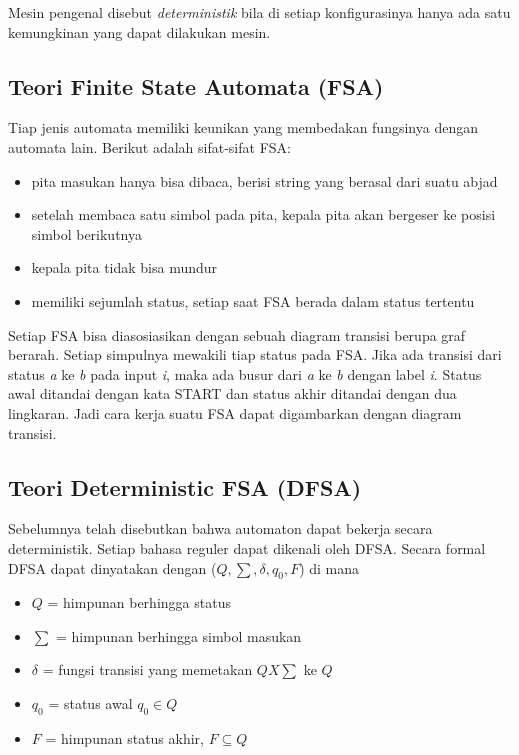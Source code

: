 Mesin pengenal disebut \textit{deterministik} bila di setiap konfigurasinya hanya ada satu kemungkinan yang dapat dilakukan mesin.

\subsection{Teori Finite State Automata (FSA)\cite{Frisca:2014}}

Tiap jenis automata memiliki keunikan yang membedakan fungsinya dengan automata lain. Berikut adalah sifat-sifat FSA:

\begin{itemize}
	\item pita masukan hanya bisa dibaca, berisi string yang berasal dari suatu abjad
	\item setelah membaca satu simbol pada pita, kepala pita akan bergeser ke posisi simbol berikutnya
	\item kepala pita tidak bisa mundur
	\item memiliki sejumlah status, setiap saat FSA berada dalam status tertentu
\end{itemize}

Setiap FSA bisa diasosiasikan dengan sebuah diagram transisi berupa graf berarah. Setiap simpulnya mewakili tiap status pada FSA. Jika ada transisi dari status \textit{a} ke \textit{b} pada input \textit{i}, maka ada busur dari \textit{a} ke \textit{b} dengan label \textit{i}. Status awal ditandai dengan kata START dan status akhir ditandai dengan dua lingkaran. Jadi cara kerja suatu FSA dapat digambarkan dengan diagram transisi.

\subsection{Teori Deterministic FSA (DFSA)\cite{Frisca:2014}}

Sebelumnya telah disebutkan bahwa automaton dapat bekerja secara deterministik. Setiap bahasa reguler dapat dikenali oleh DFSA. Secara formal DFSA dapat dinyatakan dengan ($Q,\sum,\delta,q_0,F$) di mana

\begin{itemize}
	\item $Q$ = himpunan berhingga status
	\item $\sum$ = himpunan berhingga simbol masukan
	\item $\delta$ = fungsi transisi yang memetakan $Q X \sum$ ke $Q$
	\item $q_0$ = status awal $q_0 \in Q$
	\item $F$ = himpunan status akhir, $F \subseteq Q$
\end{itemize}

